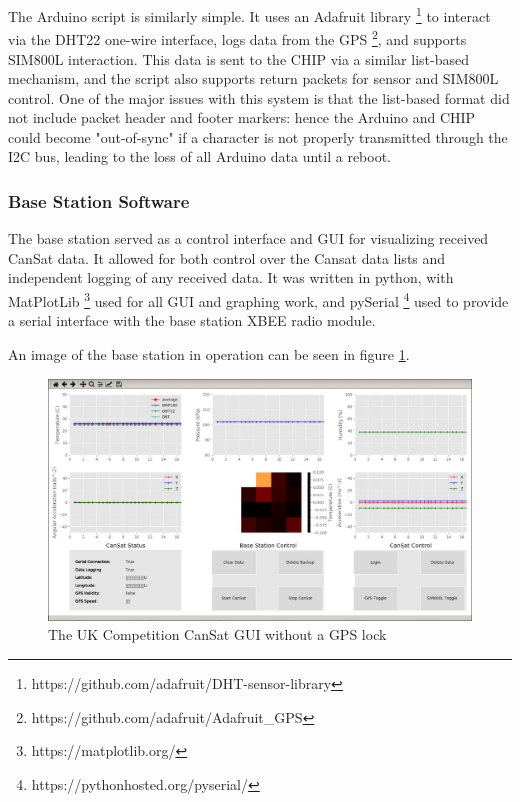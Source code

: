 \documentclass[]{report}
\begin{document}
 		The Arduino script is similarly simple. It uses an Adafruit library \footnote{https://github.com/adafruit/DHT-sensor-library} to interact via the DHT22 one-wire interface, logs data from the GPS \footnote{https://github.com/adafruit/Adafruit\_GPS}, and supports SIM800L interaction. This data is sent to the CHIP via a similar list-based mechanism, and the script also supports return packets for sensor and SIM800L control. One of the major issues with this system is that the list-based format did not include packet header and footer markers: hence the Arduino and CHIP could become "out-of-sync" if a character is not properly transmitted through the I2C bus, leading to the loss of all Arduino data until a reboot.
 		
 		\subsubsection{Base Station Software}
 		The base station served as a control interface and GUI for visualizing received CanSat data. It allowed for both control over the Cansat data lists and independent logging of any received data. It was written in python, with MatPlotLib \footnote{https://matplotlib.org/} used for all GUI and graphing work, and pySerial \footnote{https://pythonhosted.org/pyserial/} used to provide a serial interface with the base station XBEE radio module. 	
 		
 		An image of the base station in operation can be seen in figure \ref{oldgui}.	
 		
		\begin{figure}[h]
			\hfill\includegraphics[scale=0.4]{old_gui.jpg}\hspace*{\fill}
				\caption{The UK Competition CanSat GUI without a GPS lock}
			\label{oldgui}
		\end{figure}
	
\end{document}
